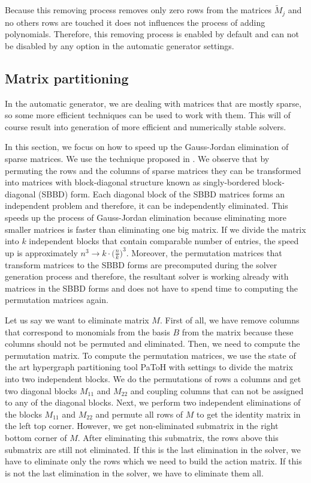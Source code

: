 

Because this removing process removes only zero rows from the matrices $\tilde{M}_j$ and no others rows are touched it does not influences the process of adding polynomials. Therefore, this removing process is enabled by default and can not be disabled by any option in the automatic generator settings.

\subsection{Matrix partitioning}
\label{subsec:matrixPart}
In the automatic generator, we are dealing with matrices that are mostly sparse, so some more efficient techniques can be used to work with them. This will of course result into generation of more efficient and numerically stable solvers.

In this section, we focus on how to speed up the Gauss-Jordan elimination of sparse matrices. We use the technique proposed in \cite{SBBD}. We observe that by permuting the rows and the columns of sparse matrices they can be transformed into matrices with block-diagonal structure known as singly-bordered block-diagonal (SBBD) form. Each diagonal block of the SBBD matrices forms an independent problem and therefore, it can be independently eliminated. This speeds up the process of Gauss-Jordan elimination because eliminating more smaller matrices is faster than eliminating one big matrix. If we divide the matrix into $k$ independent blocks that contain comparable number of entries, the speed up is approximately $n^3 \rightarrow k\cdot\big(\frac{n}{k}\big)^3$. Moreover, the permutation matrices that transform matrices to the SBBD forms are precomputed during the solver generation process and therefore, the resultant solver is working already with matrices in the SBBD forms and does not have to spend time to computing the permutation matrices again.

Let us say we want to eliminate matrix $M$. First of all, we have remove columns that correspond to monomials from the basis $B$ from the matrix because these columns should not be permuted and eliminated. Then, we need to compute the permutation matrix. To compute the permutation matrices, we use the state of the art hypergraph partitioning tool PaToH \cite{PaToH} with settings to divide the matrix into two independent blocks. We do the permutations of rows a columns and get two diagonal blocks $M_{11}$ and $M_{22}$ and coupling columns that can not be assigned to any of the diagonal blocks. Next, we perform two independent eliminations of the blocks $M_{11}$ and $M_{22}$ and permute all rows of $M$ to get the identity matrix in the left top corner. However, we get non-eliminated submatrix in the right bottom corner of $M$. After eliminating this submatrix, the rows above this submatrix are still not eliminated. If this is the last elimination in the solver, we have to eliminate only the rows which we need to build the action matrix. If this is not the last elimination in the solver, we have to eliminate them all.

